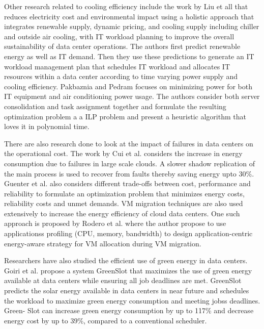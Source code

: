 \documentclass[letterpaper,twocolumn,12pt]{article}
\begin{document}
\iffalse


Other research related to cooling efficiency include the work by Liu et all \cite{liu2012renewable}  that reduces electricity cost and environmental impact using a holistic approach that integrates renewable supply, dynamic pricing, and cooling supply including chiller and outside air cooling, with IT workload planning to improve the overall sustainability of data center operations. The authors first predict renewable energy as well as IT demand. Then they use these predictions to generate an IT workload management plan that schedules IT workload and allocates IT resources within a data center according to time varying power supply and cooling efficiency. Pakbaznia and Pedram \cite{pakbaznia2009minimizing} focuses on minimizing power for both IT equipment and air conditioning power usage. The authors consider both server consolidation and task assignment together and formulate the resulting optimization problem a a ILP problem and present a heuristic algorithm that loves it in polynomial time.

There are also research done to look at the impact of failures in data centers on the operational cost. The work by Cui et al. \cite{cui2014shadows} considers the increase in energy consumption due to failures in large scale clouds. A slower shadow replication of the main process is used to recover from faults thereby saving energy upto 30\%. Guenter et al. \cite{guenter2011managing} also considers different trade-offs between cost, performance and reliability to formulate an optimization problem that minimizes energy costs, reliability costs and unmet demands. VM migration techniques are also used extensively to increase the energy efficiency of cloud data centers. One such approach is proposed by Rodero et al. \cite{rodero2012energy} where the author  propose to use applicationss profiling (CPU, memory, bandwidth) to  design application-centric energy-aware strategy for VM allocation during VM migration.

Researchers have also studied the efficient use of green energy in data centers. Goiri et al. \cite{goiri2011greenslot} propose a system GreenSlot that maximizes the use of green energy available at data centers while ensuring all job deadlines are met. GreenSlot predicts the solar energy available in data centers in near future and schedules the workload to maximize green energy consumption and meeting jobss deadlines. Green- Slot can increase green energy consumption by up to 117\% and decrease energy cost by up to 39\%, compared to a conventional scheduler. 
\end{document}

